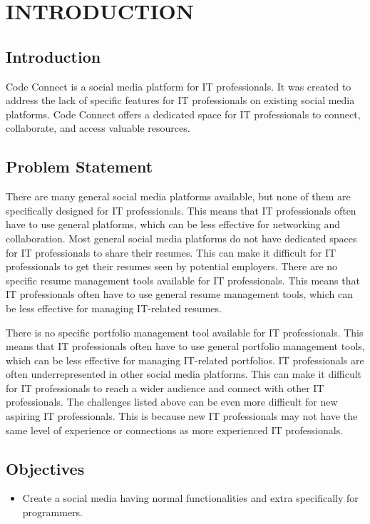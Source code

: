 \chapter{INTRODUCTION}



\section{Introduction}
Code Connect is a social media platform for IT professionals. It was created to address the lack of specific features for IT professionals on existing social media platforms. Code Connect offers a dedicated space for IT professionals to connect, collaborate, and access valuable resources.
\section{Problem Statement}

There are many general social media platforms available, but none of them are specifically designed for IT professionals. This means that IT professionals often have to use general platforms, which can be less effective for networking and collaboration.
Most general social media platforms do not have dedicated spaces for IT professionals to share their resumes. This can make it difficult for IT professionals to get their resumes seen by potential employers.
There are no specific resume management tools available for IT professionals. This means that IT professionals often have to use general resume management tools, which can be less effective for managing IT-related resumes.

There is no specific portfolio management tool available for IT professionals. This means that IT professionals often have to use general portfolio management tools, which can be less effective for managing IT-related portfolios.
IT professionals are often underrepresented in other social media platforms. This can make it difficult for IT professionals to reach a wider audience and connect with other IT professionals.
The challenges listed above can be even more difficult for new aspiring IT professionals. This is because new IT professionals may not have the same level of experience or connections as more experienced IT professionals.
\section{Objectives}
\begin{itemize}
    \item Create a social media having normal functionalities and extra specifically  for programmers.
\end{itemize}
